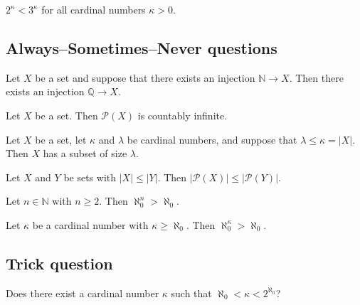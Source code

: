 \begin{chapex} %
\label{cqInfinityTFEnd}
$2^{\kappa} < 3^{\kappa}$ for all cardinal numbers $\kappa > 0$.
\end{chapex}

\subsection*{Always--Sometimes--Never questions}


\begin{chapex} %
\label{cqInfinityASNBegin}
Let $X$ be a set and suppose that there exists an injection $\mathbb{N} \to X$. Then there exists an injection $\mathbb{Q} \to X$.
\end{chapex}

\begin{chapex} %
Let $X$ be a set. Then $\mathcal{P}(X)$ is countably infinite.
\end{chapex}

\begin{chapex} %
Let $X$ be a set, let $\kappa$ and $\lambda$ be cardinal numbers, and suppose that $\lambda \le \kappa = |X|$. Then $X$ has a subset of size $\lambda$.
\end{chapex}

\begin{chapex} %
Let $X$ and $Y$ be sets with $|X| \le |Y|$. Then $|\mathcal{P}(X)| \le |\mathcal{P}(Y)|$.
\end{chapex}

\begin{chapex} %
Let $n \in \mathbb{N}$ with $n \ge 2$. Then $\aleph_0^n > \aleph_0$.
\end{chapex}

\begin{chapex} %
\label{cqInfinityASNEnd}
Let $\kappa$ be a cardinal number with $\kappa \ge \aleph_0$. Then $\aleph_0^{\kappa} > \aleph_0$.
\end{chapex}

\subsection*{Trick question}

\begin{chapex}
Does there exist a cardinal number $\kappa$ such that $\aleph_0 < \kappa < 2^{\aleph_0}$?
\end{chapex}